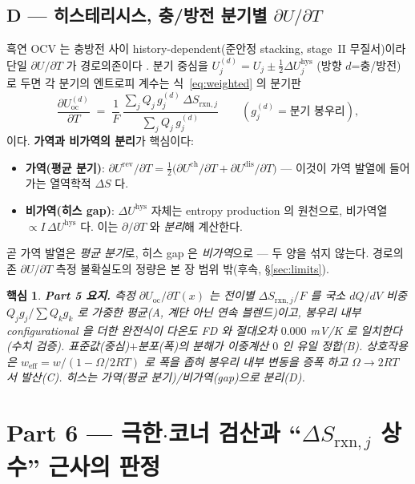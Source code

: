 \documentclass[11pt,a4paper]{article}
\newtheorem*{keybox}{핵심}
\newcommand{\rxn}{\mathrm{rxn}}
\newcommand{\rev}{\mathrm{rev}}
\newcommand{\oc}{\mathrm{oc}}
\newcommand{\eff}{\mathrm{eff}}
\begin{document}
\subsection{D — 히스테리시스, 충/방전 분기별 $\partial U/\partial T$}\label{sec:hysD}
흑연 OCV 는 충방전 사이 history-dependent(준안정 stacking, stage~II 무질서)이라 단일 $\partial U/\partial T$
가 경로의존이다 \cite{hysteresis2018}. 분기 중심을 $U_j^{(d)}=U_j\pm\tfrac12\Delta U_j^{\mathrm{hys}}$
(방향 $d$=충/방전)로 두면 각 분기의 엔트로피 계수는 식~\eqref{eq:weighted} 의 분기판
\begin{equation}
\frac{\partial U_\oc^{(d)}}{\partial T}
  \;=\; \frac{1}{F}\,\frac{\sum_j Q_j\,g_j^{(d)}\,\Delta S_{\rxn,j}}{\sum_j Q_j\,g_j^{(d)}}
\qquad(g_j^{(d)}=\text{분기 봉우리}),
\label{eq:branch}
\end{equation}
이다. \textbf{가역과 비가역의 분리}가 핵심이다:
\begin{itemize}[leftmargin=1.6em,itemsep=2pt]
\item \textbf{가역(평균 분기)}: $\partial U^{\rev}/\partial T=\tfrac12\big(\partial U^{\mathrm{ch}}/\partial T
+\partial U^{\mathrm{dis}}/\partial T\big)$ — 이것이 가역 발열에 들어가는 열역학적 $\Delta S$ 다.
\item \textbf{비가역(히스 gap)}: $\Delta U^{\mathrm{hys}}$ 자체는 entropy production 의 원천으로, 비가역열
$\propto I\,\Delta U^{\mathrm{hys}}$ 다. 이는 $\partial/\partial T$ 와 \emph{분리}해 계산한다.
\end{itemize}
곧 가역 발열은 \emph{평균 분기}로, 히스 gap 은 \emph{비가역}으로 — 두 양을 섞지 않는다. 경로의존
$\partial U/\partial T$ 측정 불확실도의 정량은 본 장 범위 밖(후속, \S\ref{sec:limits}).

\begin{keybox}
\textbf{Part 5 요지.} 측정 $\partial U_\oc/\partial T(x)$ 는 전이별 $\Delta S_{\rxn,j}/F$ 를 국소 $dQ/dV$
비중 $Q_jg_j/\sum Q_kg_k$ 로 가중한 평균(A, 계단 아닌 연속 블렌드)이고, 봉우리 내부 configurational 을
더한 완전식이 다온도 FD 와 절대오차 $0.000$ mV/K 로 일치한다(수치 검증). 표준값(중심)$+$분포(폭)의 분해가
이중계산 $0$ 인 유일 정합(B). 상호작용은 $w_\eff=w/(1-\Omega/2RT)$ 로 폭을 좁혀 봉우리 내부 변동을 증폭
하고 $\Omega\to2RT$ 서 발산(C). 히스는 가역(평균 분기)/비가역(gap)으로 분리(D).
\end{keybox}

\section*{Part 6 — 극한$\cdot$코너 검산과 ``$\Delta S_{\rxn,j}$ 상수'' 근사의 판정}
\end{document}
